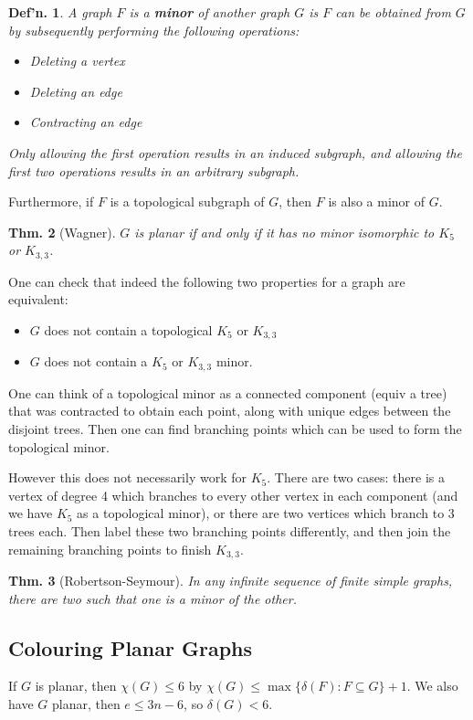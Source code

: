 \documentclass[12pt, a4paper]{book}
\newtheorem{theorem}{Thm.}[section]
\newtheorem{definition}[theorem]{Def'n.}
\theoremstyle{nonumberplain}
\begin{document}
\begin{definition}
    A graph $F$ is a \textbf{minor} of another graph $G$ is $F$ can be obtained from $G$ by subsequently performing the following operations:
    \begin{itemize}[nolistsep]
        \item Deleting a vertex
        \item Deleting an edge
        \item Contracting an edge
    \end{itemize}
    Only allowing the first operation results in an induced subgraph, and allowing the first two operations results in an arbitrary subgraph.
\end{definition}
Furthermore, if $F$ is a topological subgraph of $G$, then $F$ is also a minor of $G$.
\begin{theorem}[Wagner]
    $G$ is planar if and only if it has no minor isomorphic to $K_5$ or $K_{3,3}$.
\end{theorem}
One can check that indeed the following two properties for a graph are equivalent:
\begin{itemize}[nolistsep]
    \item $G$ does not contain a topological $K_5$ or $K_{3,3}$
    \item $G$ does not contain a $K_5$ or $K_{3,3}$ minor.
\end{itemize}
One can think of a topological minor as a connected component (equiv a tree) that was contracted to obtain each point, along with unique edges between the disjoint trees.
Then one can find branching points which can be used to form the topological minor.

However this does not necessarily work for $K_5$.
There are two cases: there is a vertex of degree 4 which branches to every other vertex in each component (and we have $K_5$ as a topological minor), or there are two vertices which branch to 3 trees each.
Then label these two branching points differently, and then join the remaining branching points to finish $K_{3,3}$.
\begin{theorem}[Robertson-Seymour]
    In any infinite sequence of finite simple graphs, there are two such that one is a minor of the other.
\end{theorem}
\subsection{Colouring Planar Graphs}
If $G$ is planar, then $\chi(G)\leq 6$ by $\chi(G)\leq\max\{\delta(F):F\subseteq G\}+1$.
We also have $G$ planar, then $e\leq 3n-6$, so $\delta(G)<6$.
\end{document}

